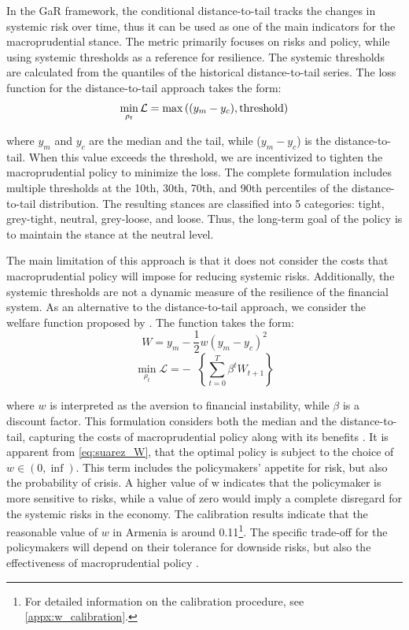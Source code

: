 In the GaR framework, the conditional distance-to-tail tracks the changes in systemic risk over time, thus it can be used as one of the main indicators for the macroprudential stance. The metric primarily focuses on risks and policy, while using systemic thresholds as a reference for resilience. The systemic thresholds are calculated from the quantiles of the historical distance-to-tail series. The loss function for the distance-to-tail approach takes the form:
\begin{equation}
    \label{eq:dt_loss}
    \min_{\rho_t}\mathcal{L} = \max{\left((y_m - y_c), \textnormal{threshold}\right)}
\end{equation}

where $y_m$ and $y_c$ are the median and the tail, while ($y_m-y_c$) is the distance-to-tail. When this value exceeds the threshold, we are incentivized to tighten the macroprudential policy to minimize the loss. The complete \citet{esrb2024} formulation includes multiple thresholds at the 10th, 30th, 70th, and 90th percentiles of the distance-to-tail distribution. The resulting stances are classified into 5 categories: tight, grey-tight, neutral, grey-loose, and loose. Thus, the long-term goal of the policy is to maintain the stance at the neutral level.

The main limitation of this approach is that it does not consider the costs that macroprudential policy will impose for reducing systemic risks. Additionally, the systemic thresholds are not a dynamic measure of the resilience of the financial system. As an alternative to the distance-to-tail approach, we consider the welfare function proposed by \citet{suarez2022}. The function takes the form:
\begin{equation}
    \label{eq:suarez_W}
    W = y_m - \frac{1}{2}w\left(y_m - y_c\right)^2
\end{equation}
\begin{equation}
    \label{eq:suarez_loss}
    \min_{\rho_t}\mathcal{L} = -\mathop{\mathbb{E}_t}\left\{\sum_{t=0}^{T}\beta^tW_{t+1}\right\}
\end{equation}

where $w$ is interpreted as the aversion to financial instability, while $\beta$ is a discount factor. This formulation considers both the median and the distance-to-tail, capturing the costs of macroprudential policy along with its benefits \citep{cecchetti_2021}. It is apparent from \autoref{eq:suarez_W}, that the optimal policy is subject to the choice of $w\in(0,\inf)$. This term includes the policymakers’ appetite for risk, but also the probability of crisis. A higher value of w indicates that the policymaker is more sensitive to risks, while a value of zero would imply a complete disregard for the systemic risks in the economy. The calibration results indicate that the reasonable value of $w$ in Armenia is around 0.11\footnote{For detailed information on the calibration procedure, see \ref{appx:w_calibration}.}. The specific trade-off for the policymakers will depend on their tolerance for downside risks, but also the effectiveness of macroprudential policy \citep{esrb2021, suarez2022}.